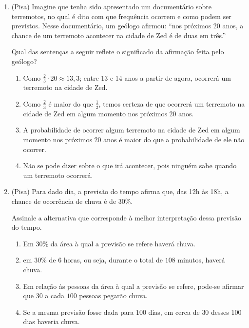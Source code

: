 \begin{enumerate}

\item (Pisa) Imagine que tenha sido apresentado um documentário sobre terremotos, no qual é dito com que frequência ocorrem  e como podem ser previstos. Nesse documentário, um geólogo afirmou: “nos próximos  20 anos, a chance de um terremoto acontecer na cidade de Zed é de duas em três.”

Qual das sentenças a seguir reflete o significado da afirmação feita pelo geólogo?
\begin{enumerate}
\item {} 
Como \(\frac{2}{3}\cdot 20\approx 13{,}3\); entre 13 e 14 anos a partir de agora, ocorrerá um terremoto na cidade de Zed.

\item {} 
Como \(\frac{2}{3}\) é maior do que \(\frac{1}{2}\), temos certeza de que ocorrerá um terremoto na cidade de Zed em algum momento nos próximos 20 anos.

\item {} 
A probabilidade de ocorrer algum terremoto na cidade de Zed em algum momento nos próximos 20 anos é maior do que a probabilidade de ele não ocorrer.

\item {} 
Não se pode dizer sobre o que irá acontecer, pois ninguém sabe quando um terremoto ocorrerá.

\end{enumerate}

\item (Pisa) Para dado dia, a previsão do tempo afirma que, das 12h às 18h, a chance de ocorrência de chuva é de $30\%$.

Assinale a alternativa que corresponde à melhor interpretação dessa previsão do tempo.
\begin{enumerate}
\item {} 
Em $30\%$ da área à qual a previsão se refere haverá chuva.

\item {} 
em $30\%$ de $6$ horas, ou seja, durante o total de $108$ minutos, haverá chuva.

\item {} 
Em relação às pessoas da área à qual a previsão se refere, pode-se afirmar que $30$ a cada $100$ pessoas pegarão chuva.

\item {} 
Se a mesma previsão fosse dada para $100$ dias, em cerca de $30$ desses $100$ dias haveria chuva.


\end{enumerate}
\end{enumerate}
